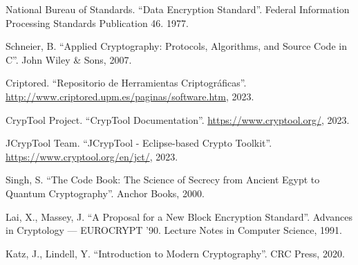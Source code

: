 \documentclass[12pt,a4paper]{article}
\begin{document}
\begin{thebibliography}{00}
	 National Bureau of Standards. ``Data Encryption Standard''. Federal Information Processing Standards Publication 46. 1977.

	 Schneier, B. ``Applied Cryptography: Protocols, Algorithms, and Source Code in C''. John Wiley \& Sons, 2007.

	 Criptored. ``Repositorio de Herramientas Criptográficas''. \url{http://www.criptored.upm.es/paginas/software.htm}, 2023.

	 CrypTool Project. ``CrypTool Documentation''. \url{https://www.cryptool.org/}, 2023.

	 JCrypTool Team. ``JCrypTool - Eclipse-based Crypto Toolkit''. \url{https://www.cryptool.org/en/jct/}, 2023.

	 Singh, S. ``The Code Book: The Science of Secrecy from Ancient Egypt to Quantum Cryptography''. Anchor Books, 2000.

	 Lai, X., Massey, J. ``A Proposal for a New Block Encryption Standard''. Advances in Cryptology — EUROCRYPT '90. Lecture Notes in Computer Science, 1991.

	 Katz, J., Lindell, Y. ``Introduction to Modern Cryptography''. CRC Press, 2020.
\end{thebibliography}
\end{document}
